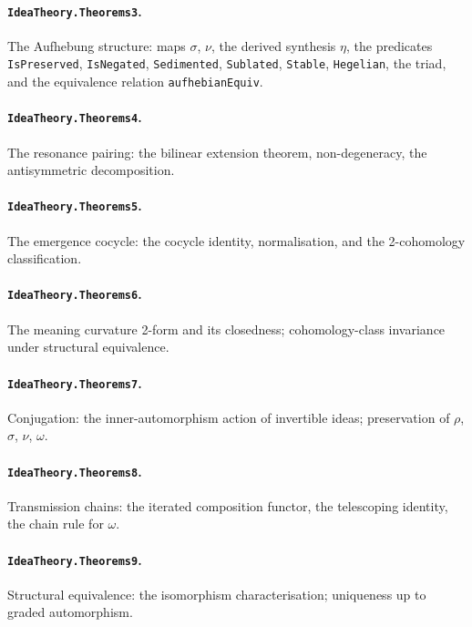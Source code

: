\paragraph{\texttt{IdeaTheory.Theorems3}.}
The Aufhebung structure: maps $\sigma$, $\nu$, the derived synthesis
$\eta$, the predicates \texttt{IsPreserved}, \texttt{IsNegated},
\texttt{Sedimented}, \texttt{Sublated}, \texttt{Stable}, \texttt{Hegelian},
the triad, and the equivalence relation \texttt{aufhebianEquiv}.

\paragraph{\texttt{IdeaTheory.Theorems4}.}
The resonance pairing: the bilinear extension theorem, non-degeneracy,
the antisymmetric decomposition.

\paragraph{\texttt{IdeaTheory.Theorems5}.}
The emergence cocycle: the cocycle identity, normalisation, and the
2-cohomology classification.

\paragraph{\texttt{IdeaTheory.Theorems6}.}
The meaning curvature 2-form and its closedness; cohomology-class
invariance under structural equivalence.

\paragraph{\texttt{IdeaTheory.Theorems7}.}
Conjugation: the inner-automorphism action of invertible ideas;
preservation of $\rho$, $\sigma$, $\nu$, $\omega$.

\paragraph{\texttt{IdeaTheory.Theorems8}.}
Transmission chains: the iterated composition functor, the telescoping
identity, the chain rule for $\omega$.

\paragraph{\texttt{IdeaTheory.Theorems9}.}
Structural equivalence: the isomorphism characterisation; uniqueness up
to graded automorphism.

